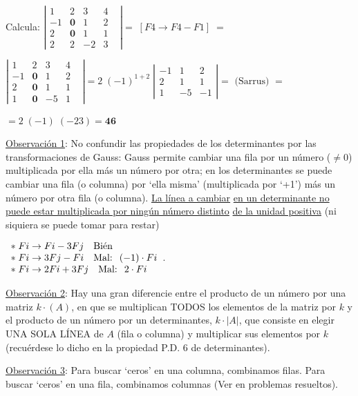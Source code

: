 \vspace{4mm}
\begin{ejem}
Calcula:  $\left|
\begin{matrix}
1&2&3&4\\-1& \boldsymbol{0}&1&2\\2&\boldsymbol{0}&1&1\\2&2&-2&3&	
\end{matrix}    
\right|=\; [F4 \to F4-F1]\; =$	

$\left|
\begin{matrix}
1&2&3&4\\-1&\boldsymbol{0}&1&2\\2&\boldsymbol{0}&1&1\\1&\boldsymbol{0}&-5&1&	
\end{matrix}    
\right|= 2 \; (-1)^{1+2} \; \left|
\begin{matrix}
-1&1&2\\2&1&1\\1&-5&-1
\end{matrix}    
\right|= \text{ (Sarrus) }=$

$ = 2\; (-1)\; (-23) = \boldsymbol{46}$

\vspace{4mm}
\underline{Observación 1}: No confundir las propiedades de los determinantes por las transformaciones de Gauss: Gauss permite cambiar una fila por un número ($\neq 0$) multiplicada por ella más un número por otra; en los determinantes se puede cambiar una fila (o columna) por `ella misma' (multiplicada por `+1') más un número por otra fila (o columna). \underline{La línea a cambiar} \underline{en un determinante no puede estar multiplicada por ningún número distinto} \underline{ de la unidad positiva} (ni siquiera se puede tomar para restar)  

\footnotesize{\textcolor{gris}{$\begin{array}{lll} *\; \* Fi \to Fi-3Fj \quad \text{Bién} \\
 *\; \* Fi \to 3Fj-Fi \quad \text{Mal: }\; (-1)\cdot Fi \\
  *\; \* Fi \to 2Fi+3Fj \quad \text{Mal: }\; 2\cdot Fi \end{array}$}}\normalsize{.}

\underline{Observación 2}: Hay una gran diferencie entre el producto de un número por una matriz $k\cdot(A)$, en que se multiplican TODOS los elementos de la matriz por $k$ y el producto de un número por un determinantes, $k\cdot |A|$, que consiste en elegir UNA SOLA LÍNEA de $A$ (fila o columna) y multiplicar sus elementos por $k$ (recuérdese lo dicho en la propiedad P.D. 6 de determinantes).

\underline{Observación 3}: Para buscar `ceros' en una columna, combinamos filas. Para buscar `ceros' en una fila, combinamos columnas (Ver en problemas resueltos).

\end{ejem}


